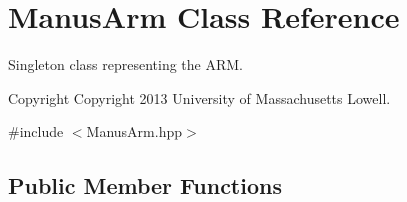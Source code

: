 \section{\-Manus\-Arm \-Class \-Reference}
\label{classManusArm}


\-Singleton class representing the \-A\-R\-M. \begin{DoxyCopyright}{\-Copyright}
\-Copyright 2013 \-University of \-Massachusetts \-Lowell. 
\end{DoxyCopyright}
 




{\ttfamily \#include $<$\-Manus\-Arm.\-hpp$>$}

\subsection*{\-Public \-Member \-Functions}
